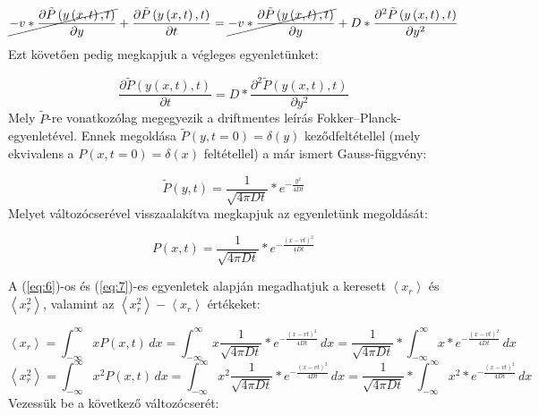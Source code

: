 \hrulefill
\begin{equation} \label{eq:31}
    \cancel{-v * \frac{\partial \tilde{P} \left( y \left( x, t \right), t \right)}{\partial y}}
    +
    \frac{\partial \tilde{P} \left( y \left( x, t \right), t \right)}{\partial t}
    =
    \cancel{-
    v * \frac{\partial \tilde{P} \left( y \left( x, t \right), t \right)}{\partial y}}
    +
    D * \frac{\partial^{2} \tilde{P} \left( y \left( x, t \right), t \right)}{\partial y^{2}}
\end{equation}
Ezt követően pedig megkapjuk a végleges egyenletünket:

\begin{equation} \label{eq:32}
    \frac{\partial \tilde{P} \left( y \left( x, t \right), t \right)}{\partial t}
    =
    D * \frac{\partial^{2} \tilde{P} \left( y \left( x, t \right), t \right)}{\partial y^{2}}
\end{equation}
Mely $\tilde{P}$-re vonatkozólag megegyezik a driftmentes leírás Fokker--Planck-egyenletével. Ennek megoldása $\tilde{P} \left( y, t = 0 \right) = \delta \left( y \right)$ keződfeltétellel (mely ekvivalens a $P \left( x, t = 0 \right) = \delta \left( x \right)$ feltétellel) a már ismert Gauss-függvény:

\begin{equation} \label{eq:33}
    \tilde{P} \left( y, t \right) = \frac{1}{\sqrt{4 \pi D t}} * e^{-\tfrac{y^{2}}{4Dt}}
\end{equation}
Melyet változócserével visszaalakítva megkapjuk az egyenletünk megoldását:

\begin{equation} \label{eq:34}
    \boxed{P \left( x, t \right) = \frac{1}{\sqrt{4 \pi D t}} * e^{-\tfrac{\left( x - vt \right)^{2}}{4Dt}}}
\end{equation}

A (\ref{eq:6})-os és (\ref{eq:7})-es egyenletek alapján megadhatjuk a keresett $\left< x_{r} \right>$ és $\left< x_{r}^{2} \right>$, valamint az $\left< x_{r}^{2} \right> - \left< x_{r} \right>$ értékeket:

\begin{equation} \label{eq:35}
    \left< x_{r} \right>
    =
    \int_{- \infty}^{\infty} x P \left( x, t \right)\, dx
    =
    \int_{- \infty}^{\infty} x \frac{1}{\sqrt{4 \pi D t}} * e^{-\tfrac{\left( x - vt \right)^{2}}{4Dt}}\, dx
    =
    \frac{1}{\sqrt{4 \pi D t}} * \int_{- \infty}^{\infty} x * e^{-\tfrac{\left( x - vt \right)^{2}}{4Dt}}\, dx
\end{equation}
\begin{equation} \label{eq:36}
    \left< x_{r}^{2} \right>
    =
    \int_{- \infty}^{\infty} x^{2} P \left( x, t \right)\, dx
    =
    \int_{- \infty}^{\infty} x^{2} \frac{1}{\sqrt{4 \pi D t}} * e^{-\tfrac{\left( x - vt \right)^{2}}{4Dt}}\, dx
    =
    \frac{1}{\sqrt{4 \pi D t}} * \int_{- \infty}^{\infty} x^{2} * e^{-\tfrac{\left( x - vt \right)^{2}}{4Dt}}\, dx
\end{equation}
Vezessük be a következő változócserét:

